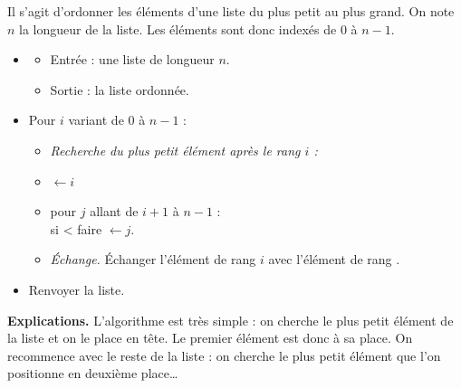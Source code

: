 \documentclass[11pt,class=report,crop=false]{standalone}
\begin{document}
\begin{activite}
	
	
	Il s'agit d'ordonner les éléments d'une liste du plus petit au plus grand.
	On note $n$ la longueur de la liste. Les éléments sont donc indexés de $0$ à $n-1$.
	
	\begin{algorithme}
	\sauteligne 	
		\begin{itemize}
			\item 
			\begin{itemize}
				\item Entrée : une liste de longueur $n$.				
				\item Sortie : la liste ordonnée.				
			\end{itemize}
			
			\item Pour $i$ variant de $0$ à $n-1$ :
			\begin{itemize}

				\item \emph{Recherche du plus petit élément après le rang $i$ :}
				
				\item {} $\leftarrow i$
				
				\item pour $j$ allant de $i+1$ à $n-1$ :\\
				\indentation si  < 	 faire   $\leftarrow j$.
											
				\item \emph{\'Echange.} \'Echanger l'élément de rang $i$ avec l'élément de rang .
					
			\end{itemize}			
						
			\item Renvoyer la liste.			
		\end{itemize}
	\end{algorithme}   
	
	\bigskip
	
	\textbf{Explications.}
 L'algorithme est très simple : on cherche le plus petit élément de la liste et on le place en tête.
 Le premier élément est donc à sa place. On recommence avec le reste de la liste : on cherche le plus petit élément que l'on positionne en deuxième place\ldots
 

\end{activite}
\end{document}
